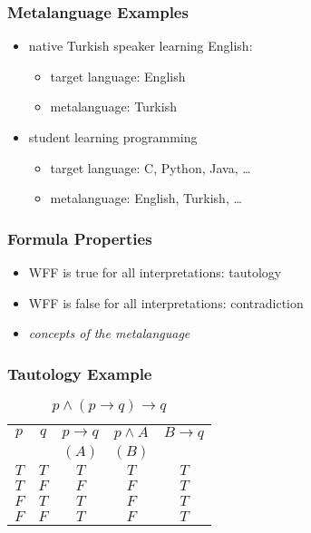 \documentclass[dvipsnames]{beamer}
\begin{document}
\begin{frame}
  \frametitle{Metalanguage Examples}

  \begin{itemize}
    \item native Turkish speaker learning English:
    \begin{itemize}
      \item target language: English
      \item metalanguage: Turkish
    \end{itemize}
  \end{itemize}

  \pause{}
  \medskip
  \begin{itemize}
    \item student learning programming
    \begin{itemize}
      \item target language: C, Python, Java, \ldots
      \item metalanguage: English, Turkish, \ldots
    \end{itemize}
  \end{itemize}
\end{frame}

\begin{frame}
  \frametitle{Formula Properties}

  \begin{itemize}
    \item WFF is true for all interpretations: \alert{tautology}
    \item WFF is false for all interpretations: \alert{contradiction}

    \pause
    \bigskip
    \item \emph{concepts of the metalanguage}
  \end{itemize}
\end{frame}

\begin{frame}
  \frametitle{Tautology Example}

  \begin{table}
    \caption{$p \wedge (p \rightarrow q) \rightarrow q$}
    \begin{tabular}{|c|c|c|c||c|}\hline
      $p$ & $q$ & $p \rightarrow q$ & $p \wedge A$ & $B \rightarrow q$\\
          &     & $(A)$             & $(B)$        &\\\hline\hline
      $T$ & $T$ & $T$ & $T$ & $T$\\\hline
      $T$ & $F$ & $F$ & $F$ & $T$\\\hline
      $F$ & $T$ & $T$ & $F$ & $T$\\\hline
      $F$ & $F$ & $T$ & $F$ & $T$\\\hline
    \end{tabular}
  \end{table}
\end{frame}
\end{document}

